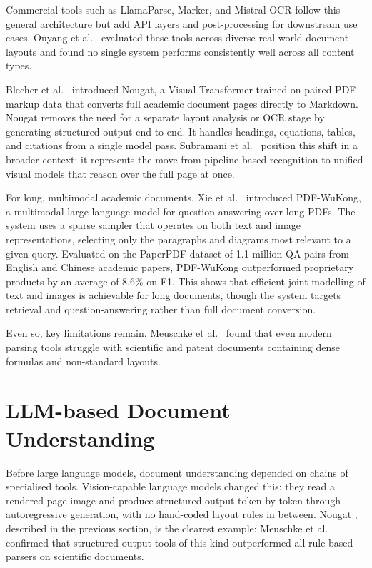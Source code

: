 Commercial tools such as LlamaParse, Marker, and Mistral OCR follow this general
architecture but add API layers and post-processing for downstream use cases.
Ouyang et al.\ \autocite{omnidocbench2025} evaluated these tools across diverse
real-world document layouts and found no single system performs consistently well
across all content types.

Blecher et al.\ \autocite{blecher2023} introduced Nougat, a Visual Transformer
trained on paired PDF-markup data that converts full academic document pages
directly to Markdown. Nougat removes the need for a separate layout analysis
or OCR stage by generating structured output end to end. It handles headings,
equations, tables, and citations from a single model pass. Subramani et al.\
\autocite{subramani2020} position this shift in a broader context: it represents
the move from pipeline-based recognition to unified visual models that reason
over the full page at once.

For long, multimodal academic documents, Xie et al.\ \autocite{wukong2024} introduced
PDF-WuKong, a multimodal large language model for question-answering over long
PDFs. The system uses a sparse sampler that operates on both text and image
representations, selecting only the paragraphs and diagrams most relevant to a
given query. Evaluated on the PaperPDF dataset of 1.1 million QA pairs from
English and Chinese academic papers, PDF-WuKong outperformed proprietary products
by an average of 8.6\% on F1. This shows that efficient joint modelling of text
and images is achievable for long documents, though the system targets retrieval
and question-answering rather than full document conversion.

Even so, key limitations remain. Meuschke et al.\ \autocite{meuschke2023} found
that even modern parsing tools struggle with scientific and patent documents
containing dense formulas and non-standard layouts.

\section{LLM-based Document Understanding}

Before large language models, document understanding depended on chains of
specialised tools. Vision-capable language models changed this: they read a
rendered page image and produce structured output token by token through
autoregressive generation, with no hand-coded layout rules in between.
Nougat \autocite{blecher2023}, described in the previous section, is the clearest
example: Meuschke et al.\ \autocite{meuschke2023} confirmed that structured-output
tools of this kind outperformed all rule-based parsers on scientific documents.

